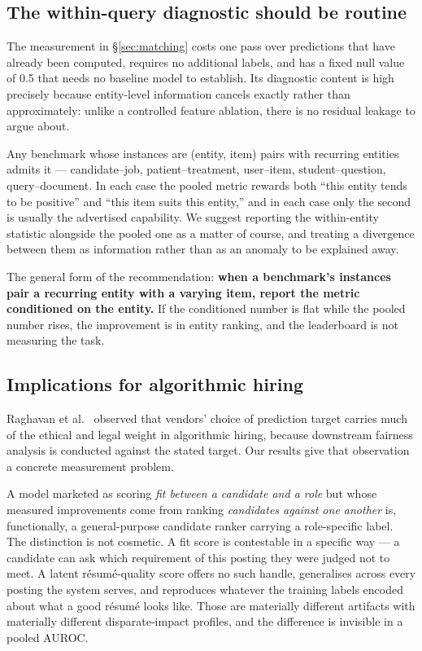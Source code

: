 \documentclass[11pt]{article}                      %
\begin{document}
\subsection{The within-query diagnostic should be routine}

The measurement in \S\ref{sec:matching} costs one pass over predictions that have
already been computed, requires no additional labels, and has a fixed null value
of 0.5 that needs no baseline model to establish. Its diagnostic content is high
precisely because entity-level information cancels exactly rather than
approximately: unlike a controlled feature ablation, there is no residual leakage
to argue about.

Any benchmark whose instances are (entity, item) pairs with recurring entities
admits it --- candidate--job, patient--treatment, user--item, student--question,
query--document. In each case the pooled metric rewards both ``this entity tends
to be positive'' and ``this item suits this entity,'' and in each case only the
second is usually the advertised capability. We suggest reporting the
within-entity statistic alongside the pooled one as a matter of course, and
treating a divergence between them as information rather than as an anomaly to be
explained away.

The general form of the recommendation: \textbf{when a benchmark's instances pair
a recurring entity with a varying item, report the metric conditioned on the
entity.} If the conditioned number is flat while the pooled number rises, the
improvement is in entity ranking, and the leaderboard is not measuring the task.

\subsection{Implications for algorithmic hiring}

Raghavan et al.~\cite{raghavan2020hiring} observed that vendors' choice of
prediction target carries much of the ethical and legal weight in algorithmic
hiring, because downstream fairness analysis is conducted against the stated
target. Our results give that observation a concrete measurement problem.

A model marketed as scoring \emph{fit between a candidate and a role} but whose
measured improvements come from ranking \emph{candidates against one another} is,
functionally, a general-purpose candidate ranker carrying a role-specific label.
The distinction is not cosmetic. A fit score is contestable in a specific way ---
a candidate can ask which requirement of this posting they were judged not to
meet. A latent résumé-quality score offers no such handle, generalises across
every posting the system serves, and reproduces whatever the training labels
encoded about what a good résumé looks like. Those are materially different
artifacts with materially different disparate-impact profiles, and the difference
is invisible in a pooled AUROC.
\end{document}
